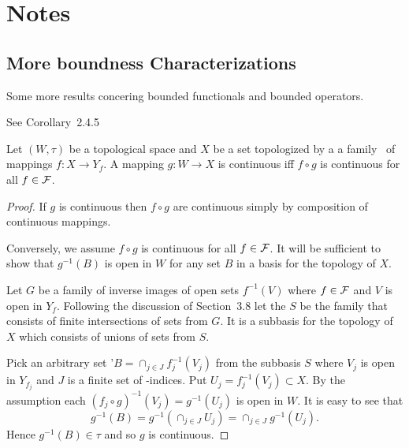 
\newcommand{\BXY}{\ensuremath{\scrB(X,Y)}}
\newcommand{\Xss}{\ensuremath{X^{**}}}

\section{Notes}

\subsection{More boundness Characterizations}

Some more results concering bounded functionals and bounded operators.

See \cite{Megginson1998} Corollary~2.4.5
\begin{llem} \label{llem:cont:bymaps}
Let \((W,\tau)\) be a topological space and $X$ be a set topologized
by a a family \calF\ of mappings \(f: X \to Y_f\).
A mapping \(g:W\to X\) is continuous iff \(f\circ g\) is continuous
for all \(f\in\mathcal{F}\).
\end{llem}
\begin{proof}
If $g$ is continuous then \(f\circ g\) are continuous simply
by composition of continuous mappings.

Conversely, we assume \(f\circ g\) is continuous for all \(f\in\mathcal{F}\).
It will be sufficient to show that \(g^{-1}(B)\) is open in $W$
for any set $B$ in a basis for the topology of $X$.

Let $G$ be a family of inverse images of open sets \(f^{-1}(V)\)
where \(f\in\mathcal{F}\) and $V$ is open in \(Y_f\).
Following  the discussion of Section~3.8
let the $S$ be the family that consists of finite intersections
of sets from $G$. It is a subbasis for 
the topology of $X$ which consists of unions of sets from $S$.

Pick an arbitrary set
'\(B = \cap_{j\in J} f_j^{-1}(V_j)\) from the subbasis $S$ where \(V_j\) is open 
in \(Y_{f_j}\) and $J$ is a finite set of \calF-indices.
Put \(U_j = f_j^{-1}(V_j) \subset X\).
By the assumption each \((f_j\circ g)^{-1}(V_j) = g^{-1}(U_j)\) 
is open in $W$.
It is easy to see that
\begin{equation*}
g^{-1}(B) = g^{-1}\left(\cap_{j\in J} U_j\right)
  = \cap_{j\in J} g^{-1}(U_j).
\end{equation*}
Hence \(g^{-1}(B) \in \tau\) and so $g$ is continuous.
\end{proof}


